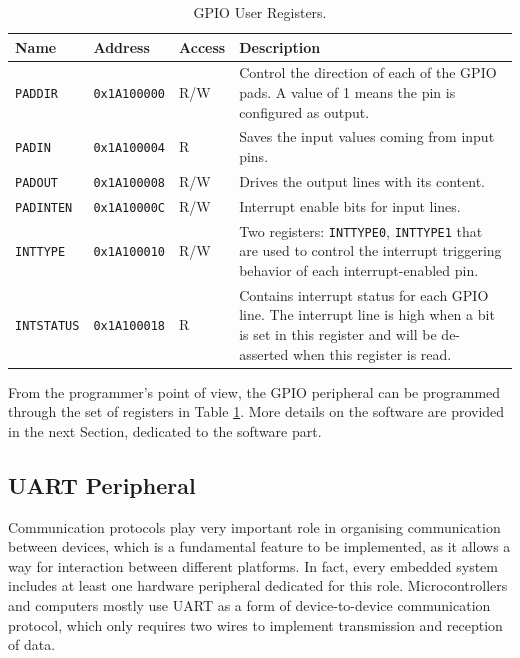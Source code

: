 \begin{table}
\centering
\begin{tabular}{| p{2cm} | p{2cm} | p{2cm} | p{7cm} |}
    \hline
    \textbf{Name} & \textbf{Address} & \textbf{Access} & \textbf{Description}\\ \hline
    \texttt{PADDIR} & \texttt{0x1A100000} & R/W & Control the direction of each of the GPIO pads. A value of 1 means the pin is configured as output.  \\ \hline
    \texttt{PADIN} & \texttt{0x1A100004} & R & Saves the input values coming from input pins.\\ \hline
    \texttt{PADOUT} & \texttt{0x1A100008} & R/W & Drives the output lines with its content.\\ \hline
    \texttt{PADINTEN} & \texttt{0x1A10000C} & R/W & Interrupt enable bits for input lines.\\ \hline
    \texttt{INTTYPE} & \texttt{0x1A100010} & R/W & Two registers: \texttt{INTTYPE0}, \texttt{INTTYPE1} that are used to control the interrupt triggering behavior of each interrupt-enabled pin. \\ \hline
    \texttt{INTSTATUS} & \texttt{0x1A100018} & R & Contains interrupt status for each GPIO line. The interrupt line is high when a bit is set in this register and will be de-asserted when this register is read.\\ \hline
    \hline
\end{tabular}
\caption{GPIO User Registers.}
\label{tab:gpio} %
\end{table}

From the programmer's point of view, the GPIO peripheral can be programmed through the set of registers in Table \ref{tab:gpio}. More details on the software are provided in the next Section, dedicated to the software part.

\subsection{UART Peripheral}
Communication protocols play very important role in organising communication between devices, which is a fundamental feature to be implemented, as it allows a way for interaction between different platforms. In fact, every embedded system includes at least one hardware peripheral dedicated for this role. Microcontrollers and computers mostly use UART as a form of device-to-device communication protocol, which only requires two wires to implement transmission and reception of data.

